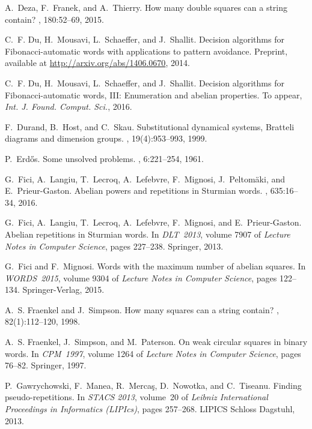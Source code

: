 \documentclass[11pt,reqno]{amsart}
\numberwithin{equation}{section}
\theoremstyle{plain}
\theoremstyle{definition}
\theoremstyle{remark}
\begin{document}
\begin{thebibliography}{10}
A.~Deza, F.~Franek, and A.~Thierry.
\newblock How many double squares can a string contain?
, 180:52--69, 2015.

C.~F. Du, H.~Mousavi, L.~Schaeffer, and J.~Shallit.
\newblock Decision algorithms for {Fibonacci}-automatic words with applications
  to pattern avoidance.
\newblock Preprint, available at \url{http://arxiv.org/abs/1406.0670}, 2014.

C.~F. Du, H.~Mousavi, L.~Schaeffer, and J.~Shallit.
\newblock Decision algorithms for {Fibonacci}-automatic words, {III}:
  Enumeration and abelian properties.
\newblock To appear, {\it Int. J. Found. Comput. Sci.}, 2016.

F.~Durand, B.~Host, and C.~Skau.
\newblock Substitutional dynamical systems, {B}ratteli diagrams and dimension
  groups.
, 19(4):953--993, 1999.

P.~Erd\H{o}s.
\newblock Some unsolved problems.
, 6:221--254, 1961.

G.~Fici, A.~Langiu, T.~Lecroq, A.~Lefebvre, F.~Mignosi, J.~Peltom\"{a}ki, and
  E.~Prieur-Gaston.
\newblock Abelian powers and repetitions in {Sturmian} words.
, 635:16--34, 2016.

G.~Fici, A.~Langiu, T.~Lecroq, A.~Lefebvre, F.~Mignosi, and E.~Prieur-Gaston.
\newblock Abelian repetitions in {Sturmian} words.
\newblock In {\em DLT~2013}, volume 7907 of {\em Lecture Notes in Computer
  Science}, pages 227--238. Springer, 2013.

G.~Fici and F.~Mignosi.
\newblock Words with the maximum number of abelian squares.
\newblock In {\em WORDS~2015}, volume 9304 of {\em Lecture Notes in Computer
  Science}, pages 122--134. Springer-Verlag, 2015.

A.~S. Fraenkel and J.~Simpson.
\newblock How many squares can a string contain?
, 82(1):112--120, 1998.

A.~S. Fraenkel, J.~Simpson, and M.~Paterson.
\newblock On weak circular squares in binary words.
\newblock In {\em CPM~1997}, volume 1264 of {\em Lecture Notes in Computer
  Science}, pages 76--82. Springer, 1997.

P.~Gawrychowski, F.~Manea, R.~{Merca\c{s}}, D.~Nowotka, and C.~Tiseanu.
\newblock Finding pseudo-repetitions.
\newblock In {\em STACS 2013}, volume~20 of {\em Leibniz International
  Proceedings in Informatics (LIPIcs)}, pages 257--268. LIPICS Schloss
  Dagstuhl, 2013.


\end{thebibliography}
\end{document}
